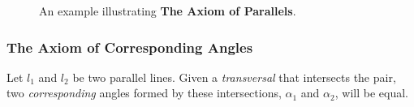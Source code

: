 \documentclass{article}
\theoremstyle{maintheorem}
\begin{document}
\begin{figure}[h]\label{ParallelFig}
    \centering

    \begin{minipage}{7cm}%
        \centering
    \end{minipage}
    \begin{minipage}{1.5cm}%
        \raisebox{-0.5\height}{
            $l_1 \parallel l_2$
        }
    \end{minipage}

    \caption{An example illustrating \textbf{The Axiom of Parallels}.}
\end{figure}

\subsubsection{The Axiom of Corresponding Angles}\label{CorresSect}
Let $l_1$ and $l_2$ be two parallel lines.
Given a \emph{transversal} that intersects the pair, two \emph{corresponding} angles formed by these intersections, $\alpha_1$ and $\alpha_2$, will be equal.
\end{document}
